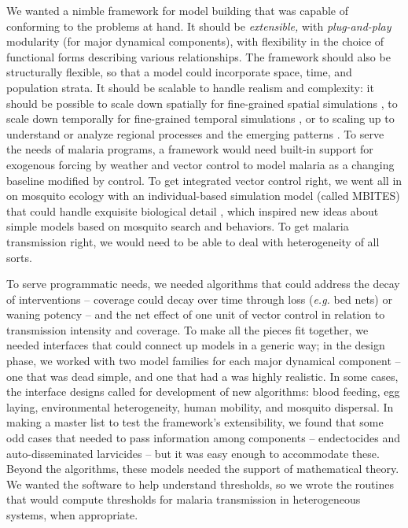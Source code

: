 \documentclass[
]{book}
\begin{document}
We wanted a nimble framework for model building that was capable of conforming to the problems at hand. It should be \emph{extensible,} with \emph{plug-and-play} modularity (for major dynamical components), with flexibility in the choice of functional forms describing various relationships. The framework should also be structurally flexible, so that a model could incorporate space, time, and population strata.
It should be scalable to handle realism and complexity: it should be possible to scale down spatially for fine-grained spatial simulations \autocite{CarterR2002SpatialSimulation,GuW2003IndividualbasedModel,PerkinsTA2013HeterogeneityMixing}, to scale down temporally for fine-grained temporal simulations \autocite{WuSL2020MBITES}, or to scaling up to understand or analyze regional processes and the emerging patterns \autocite{TatemAJ2010InternationalPopulation}.
To serve the needs of malaria programs, a framework would need built-in support for exogenous forcing by weather and vector control to model malaria as a changing baseline modified by control.
To get integrated vector control right, we went all in on mosquito ecology with an individual-based simulation model (called MBITES) that could handle exquisite biological detail \autocite{WuSL2020MBITES}, which inspired new ideas about simple models based on mosquito search and behaviors.
To get malaria transmission right, we would need to be able to deal with heterogeneity of all sorts.

To serve programmatic needs, we needed algorithms that could address the decay of interventions
-- coverage could decay over time through loss (\emph{e.g.} bed nets) or waning potency --
and the net effect of one unit of vector control in relation to transmission intensity and coverage.
To make all the pieces fit together, we needed interfaces that could connect up models in a generic way; in the design phase, we worked with two model families for each major dynamical component -- one that was dead simple, and one that had a was highly realistic.
In some cases, the interface designs called for development of new algorithms: blood feeding, egg laying, environmental heterogeneity, human mobility, and mosquito dispersal.
In making a master list to test the framework's extensibility, we found that some odd cases that needed to pass information among components -- endectocides and auto-disseminated larvicides -- but it was easy enough to accommodate these.
Beyond the algorithms, these models needed the support of mathematical theory.
We wanted the software to help understand thresholds, so we wrote the routines that would compute thresholds for malaria transmission in heterogeneous systems, when appropriate.
\end{document}
